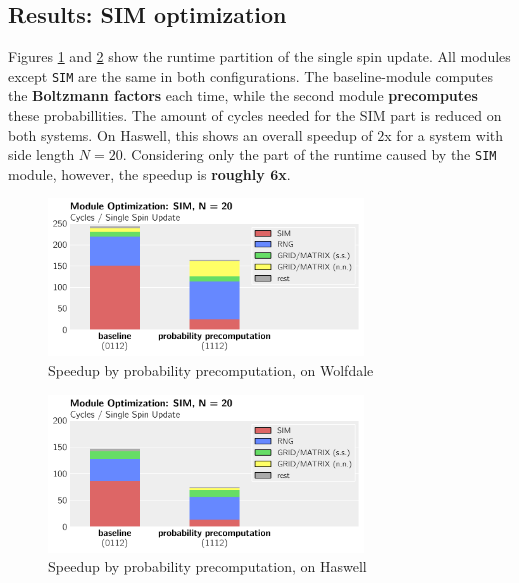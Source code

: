\documentclass[letterpaper]{article}
\begin{document}
\subsection{Results: SIM optimization} \label{res:SIM}
Figures \ref{SIM:Wolf:20} and \ref{SIM:Has:20} show the runtime partition of the single spin update. All modules except \texttt{SIM} are the same in both configurations. The baseline-module computes the \textbf{Boltzmann factors} each time, while the second module \textbf{precomputes} these probabillities. The amount of cycles needed for the SIM part is reduced on both systems. On Haswell, this shows an overall speedup of $2$x for a system with side length $N = 20$. Considering only the part of the runtime caused by the \texttt{SIM} module, however, the speedup is \textbf{roughly $\mathbf{6}$x}.
	\begin{figure}[H]\centering
	  \includegraphics[width = 8.36cm]{plots/msk_20_2.pdf}
	  \caption{Speedup by probability precomputation, on Wolfdale}
	  \label{SIM:Wolf:20}
	\end{figure}
	\begin{figure}[h]\centering
	  \includegraphics[width = 8.36cm]{plots/dg_20_2.pdf}
	  \caption{Speedup by probability precomputation, on Haswell}
	  \label{SIM:Has:20}
	\end{figure}
\end{document}
